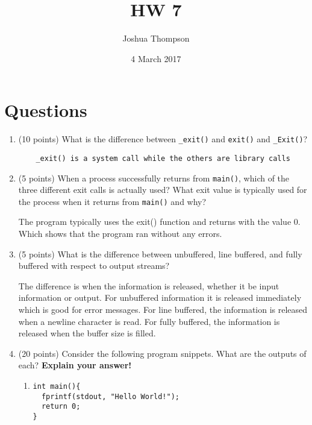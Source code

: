\documentclass{article}[9pt]
\title{HW 7}
\author{Joshua Thompson}
\date{4 March 2017}
\newenvironment{answerfont}{\fontfamily{qhv}\selectfont}{\par}
\newenvironment{myanswer}{\begin{mdframed}\begin{answerfont}}{\end{answerfont}\end{mdframed}}
\begin{document}
\maketitle

\section*{Questions}
\label{sec:orgfce6862}

\begin{enumerate}
\item (10 points) What is the difference between \texttt{\_exit()} and \texttt{exit()} and \texttt{\_Exit()}?

  \begin{myanswer}
  \begin{verbatim}
    _exit() is a system call while the others are library calls
  \end{verbatim}
  \end{myanswer}

\item (5 points) When a process successfully returns from \texttt{main()}, which of the
three different exit calls is actually used? What exit value is
typically used for the process when it returns from \texttt{main()} and
why?

  \begin{myanswer}
    The program typically uses the exit() function and returns with the value 0. Which shows that the program ran without any errors.
  \end{myanswer}

\item (5 points) What is the difference between unbuffered, line buffered, and
fully buffered with respect to output streams?

  \begin{myanswer}
    The difference is when the information is released, whether it be input information or output. For unbuffered information it is released immediately which is good for error messages. For line buffered, the information is released when a newline character is read. For fully buffered, the information is released when the buffer size is filled.
  \end{myanswer}

\item (20 points) Consider the following program snippets. What are the outputs of
each? \textbf{Explain your answer!}

\begin{enumerate}
\item
\begin{verbatim}
int main(){
  fprintf(stdout, "Hello World!");
  return 0;
}
\end{verbatim}


\end{enumerate}
\end{enumerate}
\end{document}
